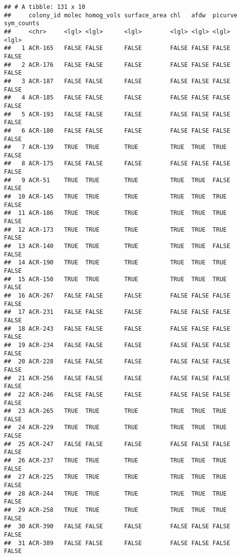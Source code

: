 \documentclass[]{article}
\begin{document}
\begin{verbatim}
## # A tibble: 131 x 10
##     colony_id molec homog_vols surface_area chl   afdw  picurve sym_counts
##     <chr>     <lgl> <lgl>      <lgl>        <lgl> <lgl> <lgl>   <lgl>     
##   1 ACR-165   FALSE FALSE      FALSE        FALSE FALSE FALSE   FALSE     
##   2 ACR-176   FALSE FALSE      FALSE        FALSE FALSE FALSE   FALSE     
##   3 ACR-187   FALSE FALSE      FALSE        FALSE FALSE FALSE   FALSE     
##   4 ACR-185   FALSE FALSE      FALSE        FALSE FALSE FALSE   FALSE     
##   5 ACR-193   FALSE FALSE      FALSE        FALSE FALSE FALSE   FALSE     
##   6 ACR-180   FALSE FALSE      FALSE        FALSE FALSE FALSE   FALSE     
##   7 ACR-139   TRUE  TRUE       TRUE         TRUE  TRUE  TRUE    FALSE     
##   8 ACR-175   FALSE FALSE      FALSE        FALSE FALSE FALSE   FALSE     
##   9 ACR-51    TRUE  TRUE       TRUE         TRUE  TRUE  FALSE   FALSE     
##  10 ACR-145   TRUE  TRUE       TRUE         TRUE  TRUE  TRUE    FALSE     
##  11 ACR-186   TRUE  TRUE       TRUE         TRUE  TRUE  TRUE    FALSE     
##  12 ACR-173   TRUE  TRUE       TRUE         TRUE  TRUE  TRUE    FALSE     
##  13 ACR-140   TRUE  TRUE       TRUE         TRUE  TRUE  FALSE   FALSE     
##  14 ACR-190   TRUE  TRUE       TRUE         TRUE  TRUE  TRUE    FALSE     
##  15 ACR-150   TRUE  TRUE       TRUE         TRUE  TRUE  TRUE    FALSE     
##  16 ACR-267   FALSE FALSE      FALSE        FALSE FALSE FALSE   FALSE     
##  17 ACR-231   FALSE FALSE      FALSE        FALSE FALSE FALSE   FALSE     
##  18 ACR-243   FALSE FALSE      FALSE        FALSE FALSE FALSE   FALSE     
##  19 ACR-234   FALSE FALSE      FALSE        FALSE FALSE FALSE   FALSE     
##  20 ACR-228   FALSE FALSE      FALSE        FALSE FALSE FALSE   FALSE     
##  21 ACR-256   FALSE FALSE      FALSE        FALSE FALSE FALSE   FALSE     
##  22 ACR-246   FALSE FALSE      FALSE        FALSE FALSE FALSE   FALSE     
##  23 ACR-265   TRUE  TRUE       TRUE         TRUE  TRUE  TRUE    FALSE     
##  24 ACR-229   TRUE  TRUE       TRUE         TRUE  TRUE  TRUE    FALSE     
##  25 ACR-247   FALSE FALSE      FALSE        FALSE FALSE FALSE   FALSE     
##  26 ACR-237   TRUE  TRUE       TRUE         TRUE  TRUE  TRUE    FALSE     
##  27 ACR-225   TRUE  TRUE       TRUE         TRUE  TRUE  TRUE    FALSE     
##  28 ACR-244   TRUE  TRUE       TRUE         TRUE  TRUE  TRUE    FALSE     
##  29 ACR-258   TRUE  TRUE       TRUE         TRUE  TRUE  TRUE    FALSE     
##  30 ACR-390   FALSE FALSE      FALSE        FALSE FALSE FALSE   FALSE     
##  31 ACR-389   FALSE FALSE      FALSE        FALSE FALSE FALSE   FALSE     

\end{verbatim}
\end{document}
